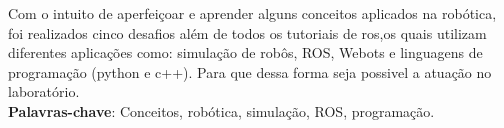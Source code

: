 \begin{thesisresumo}
Com o intuito de aperfeiçoar e aprender alguns conceitos aplicados na robótica, foi realizados cinco desafios além de todos os tutoriais
de ros,os quais utilizam diferentes aplicações como: simulação de robôs, ROS, Webots e linguagens de programação (python e c++). Para que
dessa forma seja possivel a atuação no laboratório.
\ \\


\textbf{Palavras-chave}: Conceitos, robótica, simulação, ROS, programação.

\end{thesisresumo}
